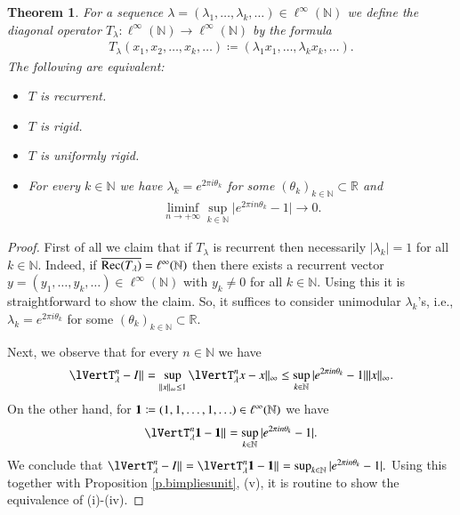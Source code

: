 \documentclass[12pt,leqno]{amsart}
\theoremstyle{plain}
\newtheorem{theorem}[equation]{Theorem}
\theoremstyle{definition}
\numberwithin{equation}{section}
\begin{document}
\begin{theorem}
	\label{t.linfty} For a sequence $\lambda =(\lambda_1,\ldots,\lambda_k,\ldots )\in \ell^\infty(\mathbb N)$ we define the diagonal operator $T_\lambda:\ell^\infty(\mathbb N) \to \ell^\infty(\mathbb N)$ by the formula 
	\begin{align*}
		T_\lambda (x_1,x_2,\ldots,x_k,\ldots)\coloneqq (\lambda_1 x_1,\ldots,\lambda_k x_k,\ldots). 
	\end{align*}
	The following are equivalent: 
	\begin{itemize}
		\item [(i)] $T$ is recurrent. 
		\item [(ii)] $T$ is rigid. 
		\item [(iii)] $T$ is uniformly rigid. 
		\item [(iv)] For every $k\in\mathbb N$ we have $\lambda_k=e^{2\pi i \theta_k}$ for some $(\theta_k)_{k\in\mathbb N}\subset {\mathbb R}$ and 
		\begin{align*}
			\liminf_{n\to+\infty} \sup_{k\in\mathbb N}{\lvert{e^{2\pi i n \theta_k}-1}\rvert} \to 0. 
		\end{align*}
	\end{itemize}
\end{theorem}

\begin{proof}
	First of all we claim that if $T_\lambda$ is recurrent then necessarily $|\lambda_k|=1$ for all $k\in\mathbb N$. Indeed, if $\overline{{\textnormal{Rec}}(T_\lambda)}=\ell^\infty(\mathbb N)$ then there exists a recurrent vector $y=(y_1,\ldots,y_k,\ldots)\in\ell^\infty(\mathbb N)$ with $y_k\neq 0$ for all $k\in\mathbb N$. Using this it is straightforward to show the claim. So, it suffices to consider unimodular $\lambda_k$'s, i.e., $\lambda_k=e^{2\pi i \theta_k}$ for some $(\theta_k)_{k\in\mathbb N}\subset {\mathbb R}$.
	
	Next, we observe that for every $n\in \mathbb N$ we have 
	\begin{align*}
		{\lVertT_\lambda ^n-I\rVert_{ }} = \sup_{\|x\|_{\infty}\leq 1} {\lVertT_\lambda ^n x- x\rVert_{ \infty}} \leq \sup_{k\in \mathbb N} {\lvert{e^{2\pi i n \theta_k}-1}\rvert} \|x\|_\infty. 
	\end{align*}
	On the other hand, for $\textbf 1\coloneqq (1,1,\ldots,1,\ldots)\in \ell^\infty(\mathbb N)$ we have 
	\begin{align*}
		{\lVertT_\lambda ^n \textbf 1- \textbf 1\rVert_{ }} = \sup_{k\in \mathbb N} {\lvert{e^{2\pi i n \theta_k}-1}\rvert}. 
	\end{align*}
	We conclude that $ {\lVertT_\lambda ^n-I\rVert_{ }} ={\lVertT_\lambda ^n \textbf 1- \textbf 1\rVert_{ }} = \sup_{k\in \mathbb N} {\lvert{e^{2\pi i n \theta_k}-1}\rvert}.$ Using this together with Proposition \ref{p.bimpliesunit}, (v), it is routine to show the equivalence of (i)-(iv). 
\end{proof}
\end{document}
